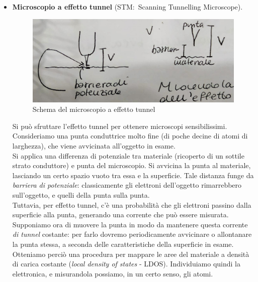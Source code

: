 \documentclass[../../FisicaTeorica.tex]{subfiles}
\begin{document}
\begin{itemize}
 \item \textbf{Microscopio a effetto tunnel} (STM:\ Scanning Tunnelling Microscope).\\
\begin{figure}[H]
\centering
\includegraphics[scale=0.3]{Immagini/Im1.jpeg}
\caption{Schema del microscopio a effetto tunnel}
\end{figure}
Si può sfruttare l'effetto tunnel per ottenere microscopi sensibilissimi.\\
Consideriamo una punta conduttrice molto fine (di poche decine di atomi di larghezza), che viene avvicinata all'oggetto in esame.\\
Si applica una differenza di potenziale tra materiale (ricoperto di un sottile strato conduttore) e punta del microscopio. Si avvicina la punta al materiale, lasciando un certo spazio vuoto tra essa e la superficie. Tale distanza funge da \textit{barriera di potenziale}: classicamente gli elettroni dell'oggetto rimarrebbero sull'oggetto, e quelli della punta sulla punta.\\
Tuttavia, per effetto tunnel, c'è una probabilità che gli elettroni passino dalla superficie alla punta, generando una corrente che può essere misurata.\\
Supponiamo ora di muovere la punta in modo da mantenere questa corrente \textit{di tunnel} costante: per farlo dovremo periodicamente avvicinare o allontanare la punta stessa, a seconda delle caratteristiche della superficie in esame. Otteniamo perciò una procedura per mappare le aree del materiale a densità di carica costante (\textit{local density of states} - LDOS). Individuiamo quindi la  elettronica, e misurandola possiamo, in un certo senso,  gli atomi.
\end{itemize}
\end{document}
